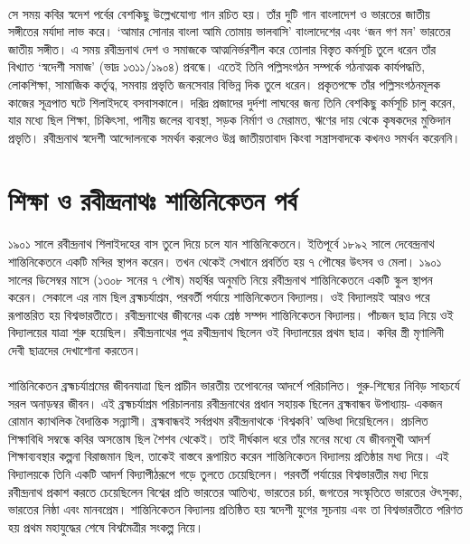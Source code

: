\documentclass{article}
\begin{document}
\paragraph{}
সে সময় কবির স্বদেশ পর্বের বেশকিছু উল্লেখযোগ্য গান রচিত হয়। তাঁর দুটি গান বাংলাদেশ ও ভারতের জাতীয় সঙ্গীতের মর্যাদা লাভ করে। ‘আমার সোনার বাংলা আমি তোমায় ভালবাসি’ বাংলাদেশের এবং ‘জন গণ মন’ ভারতের জাতীয় সঙ্গীত। এ সময় রবীন্দ্রনাথ দেশ ও সমাজকে আত্মনির্ভরশীল করে তোলার বিস্তৃত কর্মসূচি তুলে ধরেন তাঁর বিখ্যাত ‘স্বদেশী সমাজ’ (ভাদ্র ১৩১১/১৯০৪) প্রবন্ধে। এতেই তিনি পল্লিসংগঠন সম্পর্কে গঠনাত্মক কার্যপদ্ধতি, লোকশিক্ষা, সামাজিক কর্তৃত্ব, সমবায় প্রভৃতি জনসেবার বিভিন্ন দিক তুলে ধরেন। প্রকৃতপক্ষে তাঁর পল্লিসংগঠনমূলক কাজের সূত্রপাত ঘটে শিলাইদহে বসবাসকালে। দরিদ্র প্রজাদের দুর্দশা লাঘবের জন্য তিনি বেশকিছু কর্মসূচি চালু করেন, যার মধ্যে ছিল শিক্ষা, চিকিৎসা, পানীয় জলের ব্যবস্থা, সড়ক নির্মাণ ও মেরামত, ঋণের দায় থেকে কৃষকদের মুক্তিদান প্রভৃতি। রবীন্দ্রনাথ স্বদেশী আন্দোলনকে সমর্থন করলেও উগ্র জাতীয়তাবাদ কিংবা সন্ত্রাসবাদকে কখনও সমর্থন করেননি।
\section{শিক্ষা ও রবীন্দ্রনাথঃ শান্তিনিকেতন পর্ব}
\paragraph{}
১৯০১ সালে রবীন্দ্রনাথ শিলাইদহের বাস তুলে দিয়ে চলে যান শান্তিনিকেতনে। ইতিপূর্বে ১৮৯২ সালে দেবেন্দ্রনাথ শান্তিনিকেতনে একটি মন্দির স্থাপন করেন। তখন থেকেই সেখানে প্রবর্তিত হয় ৭ পৌষের উৎসব ও মেলা। ১৯০১ সালের ডিসেম্বর মাসে (১৩০৮ সনের ৭ পৌষ) মহর্ষির অনুমতি নিয়ে রবীন্দ্রনাথ শান্তিনিকেতনে একটি স্কুল স্থাপন করেন। সেকালে এর নাম ছিল ব্রহ্মচর্যাশ্রম, পরবর্তী পর্যায়ে শান্তিনিকেতন বিদ্যালয়। ওই বিদ্যালয়ই আরও পরে রূপান্তরিত হয় বিশ্বভারতীতে। রবীন্দ্রনাথের জীবনের এক শ্রেষ্ঠ সম্পদ শান্তিনিকেতন বিদ্যালয়। পাঁচজন ছাত্র নিয়ে ওই বিদ্যালয়ের যাত্রা শুরু হয়েছিল। রবীন্দ্রনাথের পুত্র রথীন্দ্রনাথ ছিলেন ওই বিদ্যালয়ের প্রথম ছাত্র। কবির স্ত্রী মৃণালিনী দেবী ছাত্রদের দেখাশোনা করতেন।
\paragraph{}
শান্তিনিকেতন ব্রহ্মচর্যাশ্রমের জীবনযাত্রা ছিল প্রাচীন ভারতীয় তপোবনের আদর্শে পরিচালিত। গুরু-শিষ্যের নিবিড় সাহচর্যে সরল অনাড়ম্বর জীবন। এই ব্রহ্মচর্যাশ্রম পরিচালনায় রবীন্দ্রনাথের প্রধান সহায়ক ছিলেন ব্রহ্মবান্ধব উপাধ্যায়- একজন রোমান ক্যাথলিক বৈদান্তিক সন্ন্যাসী। ব্রহ্মবান্ধবই সর্বপ্রথম রবীন্দ্রনাথকে ‘বিশ্বকবি’ অভিধা দিয়েছিলেন। প্রচলিত শিক্ষাবিধি সম্বন্ধে কবির অসন্তোষ ছিল শৈশব থেকেই। তাই দীর্ঘকাল ধরে তাঁর মনের মধ্যে যে জীবনমুখী আদর্শ শিক্ষাব্যবস্থার কল্পনা বিরাজমান ছিল, তাকেই বাস্তবে রূপায়িত করেন শান্তিনিকেতন বিদ্যালয় প্রতিষ্ঠার মধ্য দিয়ে। এই বিদ্যালয়কে তিনি একটি আদর্শ বিদ্যাপীঠরূপে গড়ে তুলতে চেয়েছিলেন। পরবর্তী পর্যায়ের বিশ্বভারতীর মধ্য দিয়ে রবীন্দ্রনাথ প্রকাশ করতে চেয়েছিলেন বিশ্বের প্রতি ভারতের আতিথ্য, ভারতের চর্চা, জগতের সংস্কৃতিতে ভারতের ঔৎসুক্য, ভারতের নিষ্ঠা এবং মানবপ্রেম। শান্তিনিকেতন বিদ্যালয় প্রতিষ্ঠিত হয় স্বদেশী যুগের সূচনায় এবং তা বিশ্বভারতীতে পরিণত হয় প্রথম মহাযুদ্ধের শেষে বিশ্বমৈত্রীর সংকল্প নিয়ে।
\end{document}

